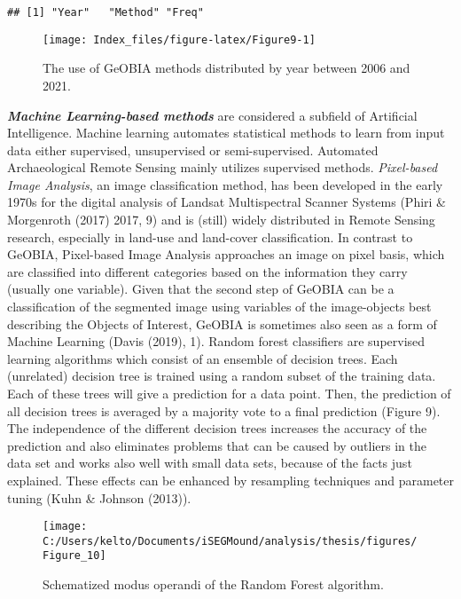 \documentclass[
  12pt,
]{article}
\begin{document}
\begin{verbatim}
## [1] "Year"   "Method" "Freq"
\end{verbatim}

\begin{figure}

{\centering \texttt{[image: Index\_files/figure-latex/Figure9-1]} 

}

\caption{The use of GeOBIA methods distributed by year between 2006 and 2021.}\label{fig:Figure9}
\end{figure}

\textbf{\emph{Machine Learning-based methods}} are considered a subfield of Artificial Intelligence. Machine learning automates statistical methods to learn from input data either supervised, unsupervised or semi-supervised. Automated Archaeological Remote Sensing mainly utilizes supervised methods.
\emph{Pixel-based Image Analysis}, an image classification method, has been developed in the early 1970s for the digital analysis of Landsat Multispectral Scanner Systems (Phiri \& Morgenroth (2017) 2017, 9) and is (still) widely distributed in Remote Sensing research, especially in land-use and land-cover classification. In contrast to GeOBIA, Pixel-based Image Analysis approaches an image on pixel basis, which are classified into different categories based on the information they carry (usually one variable). Given that the second step of GeOBIA can be a classification of the segmented image using variables of the image-objects best describing the Objects of Interest, GeOBIA is sometimes also seen as a form of Machine Learning (Davis (2019), 1).
Random forest classifiers are supervised learning algorithms which consist of an ensemble of decision trees. Each (unrelated) decision tree is trained using a random subset of the training data. Each of these trees will give a prediction for a data point. Then, the prediction of all decision trees is averaged by a majority vote to a final prediction (Figure 9). The independence of the different decision trees increases the accuracy of the prediction and also eliminates problems that can be caused by outliers in the data set and works also well with small data sets, because of the facts just explained. These effects can be enhanced by resampling techniques and parameter tuning (Kuhn \& Johnson (2013)).

\begin{figure}

{\centering \texttt{[image: C:/Users/kelto/Documents/iSEGMound/analysis/thesis/figures/Figure\_10]} 

}

\caption{Schematized modus operandi of the Random Forest algorithm.}\label{fig:Figure10}
\end{figure}
\end{document}
